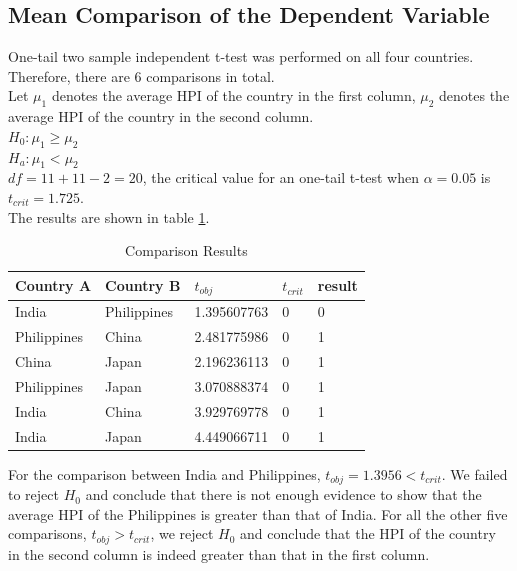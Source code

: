 \documentclass[11pt]{article}
\begin{document}
\subsection{Mean Comparison of the Dependent Variable}\label{mean_comparison}
One-tail two sample independent t-test was performed on all four countries. Therefore, there are 6 comparisons in total.\\
Let $\mu_1$ denotes the average HPI of the country in the first column, $\mu_2$ denotes the average HPI of the country in the second column.\\
$H_0: \mu_1\geq \mu_2$\\
$H_a: \mu_1< \mu_2$\\
$df=11+11-2=20$, the critical value for an one-tail t-test when $\alpha=0.05$ is $t_{crit}=1.725$.\\
The results are shown in table \ref{tab:comparison_results}.
\begin{table}[H]
\centering
\begin{tabular}{|l|l|l|l|l|}
\hline
Country A   & Country B   & $t_{obj}$ & $t_{crit}$ & result \\ \hline
India       & Philippines & 1.395607763 & 0          & 0      \\ \hline
Philippines & China       & 2.481775986 & 0          & 1      \\ \hline
China       & Japan       & 2.196236113 & 0          & 1      \\ \hline
Philippines & Japan       & 3.070888374 & 0          & 1      \\ \hline
India       & China       & 3.929769778 & 0          & 1      \\ \hline
India       & Japan       & 4.449066711 & 0          & 1      \\ \hline
\end{tabular}
\caption{Comparison Results}
\label{tab:comparison_results}
\end{table}

For the comparison between India and Philippines, $t_{obj}=1.3956<t_{crit}$. We failed to reject $H_0$ and conclude that there is not enough evidence to show that the average HPI of the Philippines is greater than that of India. For all the other five comparisons, $t_{obj}>t_{crit}$, we reject $H_0$ and conclude that the HPI of the country in the second column is indeed greater than that in the first column.
\end{document}
